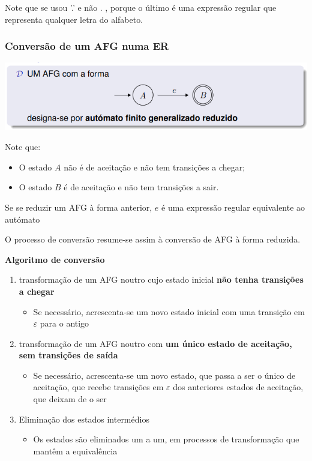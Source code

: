 \documentclass{article}
\begin{document}
\begin{flushleft}
  \item Note que se usou '.' e não . , porque o último é uma expressão regular que representa
  qualquer letra do alfabeto.

  \subsubsection{Conversão de um AFG numa ER}

  \begin{center}
    \includegraphics[scale=0.4]{83}
  \end{center}

  \item Note que:
  \begin{itemize}
    \item O estado $A$ não é de aceitação e não tem transições a chegar;
    \item O estado $B$ é de aceitação e não tem transições a sair.
  \end{itemize}
  \item Se se reduzir um AFG à forma anterior, $e$ é uma expressão regular equivalente ao autómato
  \item O processo de conversão resume-se assim à conversão de AFG à forma reduzida.

  \textbf{Algoritmo de conversão}

  \begin{enumerate}
    \item transformação de um AFG noutro cujo estado inicial \textbf{não tenha transições a chegar}
    \begin{itemize}
      \item Se necessário, acrescenta-se um novo estado inicial com uma transição em $\varepsilon$ para o antigo
    \end{itemize}
    \item transformação de um AFG noutro com \textbf{um único estado de aceitação, sem transições de saída}
    \begin{itemize}
      \item Se necessário, acrescenta-se um novo estado, que passa a ser o único de aceitação, que recebe
      transições em $\varepsilon$ dos anteriores estados de aceitação, que deixam de o ser
    \end{itemize}
    \item Eliminação dos estados intermédios
    \begin{itemize}
      \item Os estados são eliminados um a um, em processos de transformação que mantêm a equivalência
    \end{itemize}
  \end{enumerate}
\end{flushleft}
\end{document}
